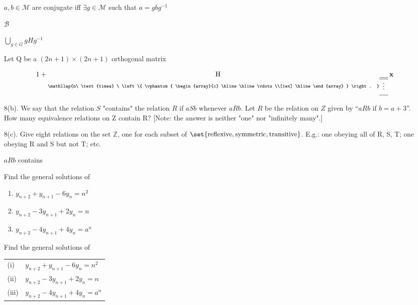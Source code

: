 \documentclass{article}
\newcommand*\tensordim[2]{
 \underset{
  \mathllap{#2\ \text{times}
  \ \left\{
   \vphantom{
    \begin{array}{c}
     \hline \hline \vdots \\[1ex] \hline
    \end{array}
   } \right.
  }
  \begin{array}{c}
   \hline \hline \vdots \\[1ex] \hline
  \end{array}
 }
 {\mathrm #1}
}
\begin{document}
\(a, b \in \mathcal M\) are conjugate iff \(\mathop\exists g \in \mathcal M\) such that \(a = g b g^{-1}\)

\(\mathscr B\)

\(\bigcup\limits_{g \in G} g H g^{-1}\)

Let Q be a \((2n+1)\times(2n+1)\) orthogonal matrix

\begin{equation*}
 1 + \tensordim{H}{n} \,\mathbf x
\end{equation*}

8(b). We say that the relation \(S\) "contains" the relation \(R\) if \(aSb\)
whenever \(aRb\).  Let \(R\) be the relation on \(Z\) given by ``\(aRb\) if
\(b = a + 3\)''.  How many equivalence relations on Z contain R?  [Note: the
answer is neither "one" nor "infinitely many".]

8(c). Give eight relations on the set \(\mathbb Z\), one for each subset of
\(\set{\text{reflexive}, \text{symmetric}, \text{transitive}}\).  E.g.: one
obeying all of R, S, T; one obeying R and S but not T; etc.


\(a R b\) contains

Find the general solutions of
\begin{enumerate}[label=(\roman*)]
 \item \(y_{n + 2} + y_{n + 1} - 6 y_n = n^2\)
 \item \(y_{n + 2} - 3 y_{n + 1} + 2 y_n = n\)
 \item \(y_{n + 2} - 4 y_{n + 1} + 4 y_n = a^n\)
\end{enumerate}

Find the general solutions of \\
\begin{tabular}{ll}
  (i) & \(y_{n + 2} + y_{n + 1} - 6 y_n = n^2\) \\
 (ii) & \(y_{n + 2} - 3 y_{n + 1} + 2 y_n = n\) \\
(iii) & \(y_{n + 2} - 4 y_{n + 1} + 4 y_n = a^n\) \\
\end{tabular}
\end{document}
